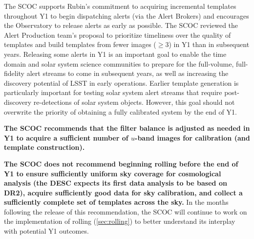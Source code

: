  The SCOC supports Rubin's commitment to acquiring incremental templates throughout Y1 to begin dispatching alerts (via the Alert Brokers) and encourages the Observatory to release alerts as early as possible. The SCOC reviewed the Alert Production team's proposal to prioritize timeliness over the quality of templates and build templates from fewer images ($\geq 3$) in Y1 than in subsequent years. Releasing some alerts in Y1 is an important goal to enable the time domain and solar system science communities to prepare for the full-volume, full-fidelity alert streams to come in subsequent years, as well as increasing the discovery potential of LSST in early operations. Earlier template generation is particularly important for testing solar system alert streams that require post-discovery re-detections of solar system objects.
 However, this goal should not overwrite the priority of obtaining a fully calibrated system by the end of Y1.

 {\bf The SCOC recommends that the filter balance is adjusted as needed in Y1 to acquire a sufficient number of $u$-band images for calibration (and template construction). }

 {\bf The SCOC does not recommend beginning rolling before the end of Y1 to ensure sufficiently uniform sky coverage for cosmological analysis (the DESC expects its first data analysis to be based on DR2), acquire sufficiently good data for sky calibration, and collect a 
 sufficiently complete set of templates across the sky.} In the months following the release of this recommendation, the SCOC will continue to work on the implementation of rolling (\autoref{sec:rolling}) to better understand its interplay with potential Y1 outcomes. 


\FloatBarrier



